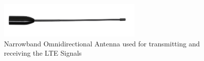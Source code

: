 \begin{figure}[H]
    \begin{center}
        \includegraphics[width=7cm]{images/vert400.jpg}
        \caption{Narrowband Omnidirectional Antenna used for transmitting and receiving the LTE Signals}
        \label{fig:USRPAnt}
    \end{center}
\end{figure}
